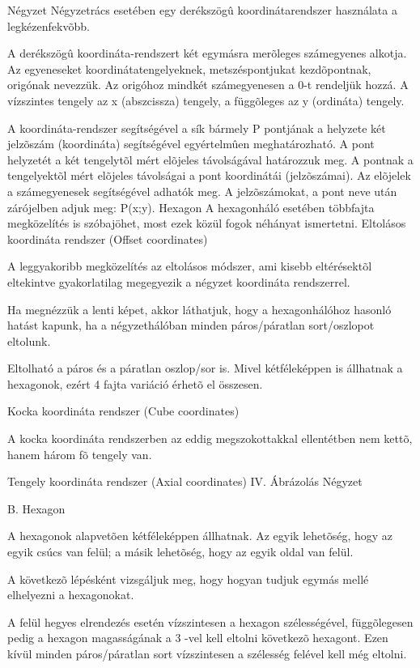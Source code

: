 
Négyzet
Négyzetrács esetében egy derékszögû koordinátarendszer használata a legkézenfekvõbb. 

A derékszögû koordináta-rendszert két egymásra merõleges számegyenes alkotja. Az egyeneseket koordinátatengelyeknek, metszéspontjukat kezdõpontnak, origónak nevezzük. Az origóhoz mindkét számegyenesen a 0-t rendeljük hozzá. A vízszintes tengely az x (abszcissza) tengely, a függõleges az y (ordináta) tengely.

A koordináta-rendszer segítségével a sík bármely P pontjának a helyzete két jelzõszám (koordináta) segítségével egyértelmûen meghatározható. A pont helyzetét a két tengelytõl mért elõjeles távolságával határozzuk meg. A pontnak a tengelyektõl mért elõjeles távolságai a pont koordinátái (jelzõszámai). Az elõjelek a számegyenesek segítségével adhatók meg. A jelzõszámokat, a pont neve után zárójelben adjuk meg: P(x;y).
Hexagon
A hexagonháló esetében többfajta megközelítés is szóbajöhet, most ezek közül fogok néhányat ismertetni. 
Eltolásos koordináta rendszer (Offset coordinates)

	A leggyakoribb megközelítés az eltolásos módszer, ami kisebb eltérésektõl eltekintve gyakorlatilag megegyezik a négyzet koordináta rendszerrel. 

Ha megnézzük a lenti képet, akkor láthatjuk, hogy a hexagonhálóhoz hasonló hatást kapunk, ha a négyzethálóban minden páros/páratlan sort/oszlopot eltolunk.

Eltolható a páros és a páratlan oszlop/sor is. Mivel kétféleképpen is állhatnak a hexagonok, ezért 4 fajta variáció érhetõ el összesen.
		
Kocka koordináta rendszer (Cube coordinates)

	A kocka koordináta rendszerben az eddig megszokottakkal ellentétben nem kettõ, hanem három fõ tengely van.

Tengely koordináta rendszer (Axial coordinates)
IV. Ábrázolás
Négyzet

B. Hexagon

A hexagonok alapvetõen kétféleképpen állhatnak. 
Az egyik lehetõség, hogy az egyik csúcs van felül;
a másik lehetõség, hogy az egyik oldal van felül. 

A következõ lépésként vizsgáljuk meg, hogy hogyan tudjuk egymás mellé elhelyezni a hexagonokat.

A felül hegyes elrendezés esetén vízszintesen a hexagon szélességével, függõlegesen pedig a hexagon magasságának a 3 -vel kell eltolni következõ hexagont. Ezen kívül minden páros/páratlan sort vízszintesen a szélesség felével kell még eltolni.

